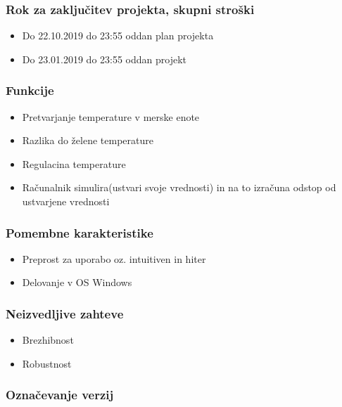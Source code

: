 \documentclass[a4paper,12pt]{article}
\begin{document}
		\subsubsection{Rok za zaključitev projekta, skupni stroški}

				\begin{itemize}
					\item Do 22.10.2019 do 23:55 oddan plan projekta 
					\item Do 23.01.2019 do 23:55 oddan projekt
				\end{itemize}

		\subsubsection{Funkcije}

				\begin{itemize}
					\item Pretvarjanje temperature v merske enote
					\item Razlika do želene temperature
					\item Regulacina temperature
					\item Računalnik simulira(ustvari svoje vrednosti) in na to	izračuna odstop od ustvarjene vrednosti
				\end{itemize}

		\subsubsection{Pomembne karakteristike}

				\begin{itemize}
					\item Preprost za uporabo oz. intuitiven in hiter
					\item Delovanje v OS Windows
				\end{itemize}

		\subsubsection{Neizvedljive zahteve}

				\begin{itemize}
					\item Brezhibnost
					\item Robustnost
				\end{itemize}

		\subsubsection{Označevanje verzij}
\end{document}

